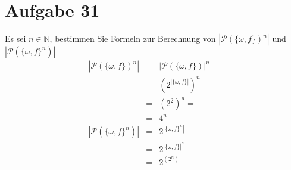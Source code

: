 \section{Aufgabe 31}
\setcounter{section}{31}

Es sei $n \in \mathbb{N}$, bestimmen Sie Formeln zur Berechnung von $|\mathcal{P}(\{\omega, f\})^n|$ und $|\mathcal{P}(\{\omega, f\}^n)|$
\begin{equation*}
    \begin{array}{rcl}
        |\mathcal{P}(\{\omega, f\})^n| &=& |\mathcal{P}(\{\omega, f\})|^n = \\[5pt]
                                       &=& (2^{|\{\omega, f\}|})^n = \\[5pt]
                                       &=& (2^2)^n = \\[5pt]
                                       &=& 4^n \\[10pt]
        |\mathcal{P}(\{\omega, f\}^n)| &=& 2^{|\{\omega, f\}^n|} \\[5pt]
                                       &=& 2^{|\{\omega, f\}|^n} \\[5pt]
                                       &=& 2^{(2^n)}
    \end{array}
\end{equation*}
